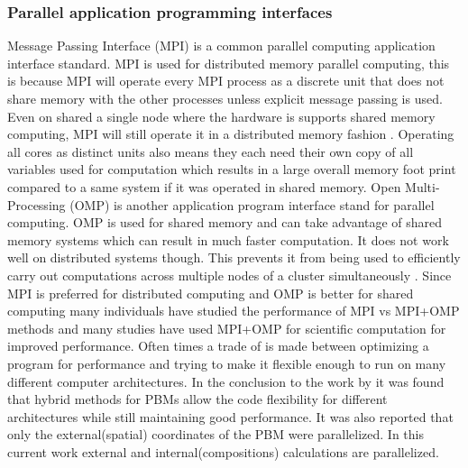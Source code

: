 \documentclass[preprint,11pt,authoryear]{elsarticle}
\begin{document}
\subsubsection{Parallel application programming interfaces}
 Message Passing Interface (MPI) is a common parallel computing application interface standard. 
MPI is used for distributed memory parallel computing, this is because MPI will operate every MPI 
process as a discrete unit that does not share memory with the other processes unless explicit 
message passing is used. Even on shared a single node where the hardware is supports shared 
memory computing, MPI will still operate it in a distributed memory fashion \citep{Jin2011}. Operating all 
cores as distinct units also means they each need their own copy of all variables used for computation 
which results in a large overall memory foot print compared to a same system if it was operated in 
shared memory. 
 Open Multi-Processing (OMP) is another application program interface stand for parallel 
computing. OMP is used for shared memory and can take advantage of shared memory systems which 
can result in much faster computation. It does not work well on distributed systems though. This 
prevents it from being used to efficiently carry out computations across multiple nodes of a cluster 
simultaneously \citep{Jin2011}. 
 Since MPI is preferred for distributed computing and OMP is better for shared computing many 
individuals have studied the performance of MPI vs MPI+OMP methods and many studies have used 
MPI+OMP for scientific computation for improved performance. Often times a trade of is made 
between optimizing a program for performance and trying to make it flexible enough to run on many 
different computer architectures. In the conclusion to the work by \cite{Bettencourt2017} it was found 
that hybrid methods for PBMs allow the code flexibility for different architectures while still maintaining 
good performance.  It was also reported that only the external(spatial) coordinates of the PBM were 
parallelized. In this current work external and internal(compositions) calculations are parallelized. 
\end{document}
